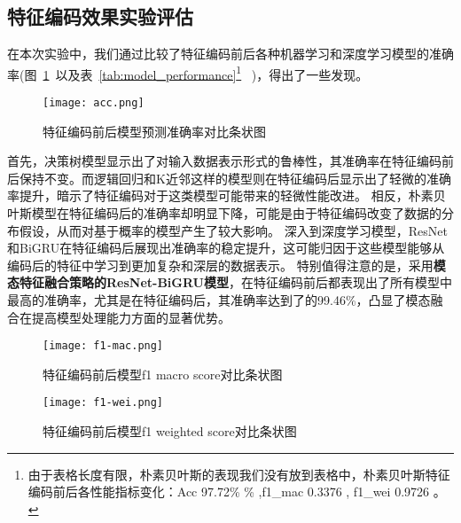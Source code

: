 \subsection{特征编码效果实验评估}

  在本次实验中，我们通过比较了特征编码前后各种机器学习和深度学习模型的准确率(图~\ref{fig:comapre_accuracy_encoding}~以及表~\ref{tab:model_performance}\footnote{由于表格长度有限，朴素贝叶斯的表现我们没有放到表格中，朴素贝叶斯特征编码前后各性能指标变化：Acc 97.72\% \% ,f1\_mac 0.3376 , f1\_wei 0.9726 。}
  ~)，得出了一些发现。
  \begin{figure}[htbp]
    \centering
    \texttt{[image: acc.png]}
    \caption{特征编码前后模型预测准确率对比条状图}
    \label{fig:comapre_accuracy_encoding}
    \end{figure}
    首先，决策树模型显示出了对输入数据表示形式的鲁棒性，其准确率在特征编码前后保持不变。而逻辑回归和K近邻这样的模型则在特征编码后显示出了轻微的准确率提升，暗示了特征编码对于这类模型可能带来的轻微性能改进。
  相反，朴素贝叶斯模型在特征编码后的准确率却明显下降，可能是由于特征编码改变了数据的分布假设，从而对基于概率的模型产生了较大影响。
  深入到深度学习模型，ResNet和BiGRU在特征编码后展现出准确率的稳定提升，这可能归因于这些模型能够从编码后的特征中学习到更加复杂和深层的数据表示。
  特别值得注意的是，采用\textbf{模态特征融合策略的ResNet-BiGRU模型}，在特征编码前后都表现出了所有模型中最高的准确率，尤其是在特征编码后，其准确率达到了的99.46\%，凸显了模态融合在提高模型处理能力方面的显著优势。\par
  \begin{figure}[htbp]
    \centering
    \texttt{[image: f1-mac.png]}
    \caption{特征编码前后模型f1 macro score对比条状图}
    \label{fig:f1_macro_score}
    \end{figure}
  \begin{figure}[htbp]
    \centering
    \texttt{[image: f1-wei.png]}
    \caption{特征编码前后模型f1 weighted score对比条状图}
    \label{fig:f1_weighted_score}
\end{figure}

